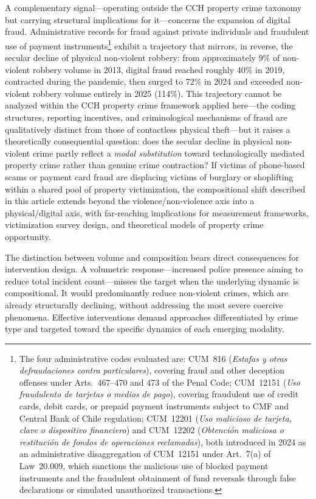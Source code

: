 \documentclass[pdflatex,sn-basic]{sn-jnl}
\begin{document}
A complementary signal---operating outside the CCH property crime taxonomy but carrying structural implications for it---concerns the expansion of digital fraud. Administrative records for fraud against private individuals and fraudulent use of payment instruments\footnote{The four administrative codes evaluated are: CUM~816 (\textit{Estafas y otras defraudaciones contra particulares}), covering fraud and other deception offenses under Arts.~467--470 and 473 of the Penal Code; CUM~12151 (\textit{Uso fraudulento de tarjetas o medios de pago}), covering fraudulent use of credit cards, debit cards, or prepaid payment instruments subject to CMF and Central Bank of Chile regulation; CUM~12201 (\textit{Uso malicioso de tarjeta, clave o dispositivo financiero}) and CUM~12202 (\textit{Obtención maliciosa o restitución de fondos de operaciones reclamadas}), both introduced in 2024 as an administrative disaggregation of CUM~12151 under Art.~7(a) of Law~20.009, which sanctions the malicious use of blocked payment instruments and the fraudulent obtainment of fund reversals through false declarations or simulated unauthorized transactions.} exhibit a trajectory that mirrors, in reverse, the secular decline of physical non-violent robbery: from approximately 9\% of non-violent robbery volume in 2013, digital fraud reached roughly 40\% in 2019, contracted during the pandemic, then surged to 72\% in 2024 and exceeded non-violent robbery volume entirely in 2025 (114\%). This trajectory cannot be analyzed within the CCH property crime framework applied here---the coding structures, reporting incentives, and criminological mechanisms of fraud are qualitatively distinct from those of contactless physical theft---but it raises a theoretically consequential question: does the secular decline in physical non-violent crime partly reflect a \emph{modal substitution} toward technologically mediated property crime rather than genuine crime contraction? If victims of phone-based scams or payment card fraud are displacing victims of burglary or shoplifting within a shared pool of property victimization, the compositional shift described in this article extends beyond the violence/non-violence axis into a physical/digital axis, with far-reaching implications for measurement frameworks, victimization survey design, and theoretical models of property crime opportunity.

The distinction between volume and composition bears direct consequences for intervention design. A volumetric response---increased police presence aiming to reduce total incident count---misses the target when the underlying dynamic is compositional. It would predominantly reduce non-violent crimes, which are already structurally declining, without addressing the most severe coercive phenomena. Effective interventions demand approaches differentiated by crime type and targeted toward the specific dynamics of each emerging modality.
\end{document}
